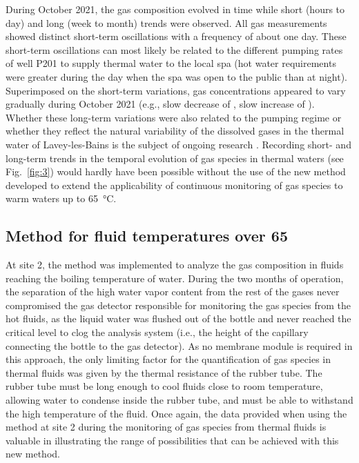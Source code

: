During October 2021, the gas composition evolved in time while short (hours to day) and long (week to month) trends were observed. 
All gas measurements showed distinct short-term oscillations with a frequency of about one day.
These short-term oscillations can most likely be related to the different pumping rates of well P201 to supply thermal water to the local spa (hot water requirements were greater during the day when the spa was open to the public than at night).
Superimposed on the short-term variations, gas concentrations appeared to vary gradually during October 2021 (e.g., slow decrease of , slow increase of ).
Whether these long-term variations were also related to the pumping regime or whether they reflect the natural variability of the dissolved gases in the thermal water of Lavey-les-Bains is the subject of ongoing research \citep{giroud2022monitoring}.
Recording short- and long-term trends in the temporal evolution of gas species in thermal waters (see Fig.~\ref{fig:3}) would hardly have been possible without the use of the new method developed to extend the applicability of continuous monitoring of gas species to warm waters up to \SI{65}{\celsius}.

\subsection{Method for fluid temperatures over 65\textcelsius}
At site 2, the method was implemented to analyze the gas composition in fluids reaching the boiling temperature of water.
During the two months of operation, the separation of the high water vapor content from the rest of the gases never compromised the gas detector responsible for monitoring the gas species from the hot fluids, as the liquid water was flushed out of the bottle and never reached the critical level to clog the analysis system (i.e., the height of the capillary connecting the bottle to the gas detector).
As no membrane module is required in this approach, the only limiting factor for the quantification of gas species in thermal fluids was given by the thermal resistance of the rubber tube.
The rubber tube must be long enough to cool fluids close to room temperature, allowing water to condense inside the rubber tube, and must be able to withstand the high temperature of the fluid.
Once again, the data provided when using the method at site 2 during the monitoring of gas species from thermal fluids is valuable in illustrating the range of possibilities that can be achieved with this new method. 

